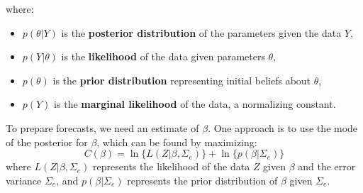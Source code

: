 \documentclass{beamer}
\begin{document}
{\begin{frame}
where:
\begin{itemize}
    \item \( p(\theta | Y) \) is the \textbf{posterior distribution} of the parameters given the data \( Y \),
    \item \( p(Y | \theta) \) is the \textbf{likelihood} of the data given parameters \( \theta \),
    \item \( p(\theta) \) is the \textbf{prior distribution} representing initial beliefs about \( \theta \),
    \item \( p(Y) \) is the \textbf{marginal likelihood} of the data, a normalizing constant.
\end{itemize}
To prepare forecasts, we need an estimate of \( \beta \). One approach is to use the mode of the posterior for \( \beta \), which can be found by maximizing:
\[
C(\beta) = \ln \{ L(Z | \beta, \Sigma_e) \} + \ln \{ p(\beta | \Sigma_e) \}
\]
where \( L(Z | \beta, \Sigma_e) \) represents the likelihood of the data \( Z \) given \( \beta \) and the error variance \( \Sigma_e \), and \( p(\beta | \Sigma_e) \) represents the prior distribution of \( \beta \) given \( \Sigma_e \).
\end{frame}
}
\end{document}
